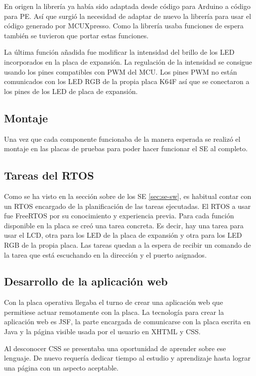En origen la librería ya había sido adaptada desde código para Arduino a
código para PE. Así que surgió la necesidad de adaptar de nuevo la librería para
usar el código generado por MCUXpresso. Como la librería usaba funciones de
espera también se tuvieron que portar estas funciones.

La última función añadida fue modificar la intensidad del brillo de los LED
incorporados en la placa de expansión. La regulación de la intensidad se
consigue usando los pines compatibles con PWM del MCU. Los pines PWM no
están comunicados con los LED RGB de la propia placa K64F así que se conectaron
a los pines de los LED de placa de expansión.

\subsection{Montaje }{\label{sec:desarrollo-montaje}}
Una vez que cada componente funcionaba de la manera esperada se realizó
el montaje en las placas de pruebas para poder hacer funcionar el SE al
completo. 

\subsection{Tareas del RTOS}{\label{sec:desarrollo-rtos}}
Como se ha visto en la sección sobre  de los SE 
\ref{sec:se-sw}, es habitual contar con un RTOS encargado de la planificación
de las tareas ejecutadas. El RTOS a usar fue FreeRTOS por su conocimiento y
experiencia previa. Para cada función disponible en la placa se creó una tarea
concreta. Es decir, hay una tarea para usar el LCD, otra para los LED de la
placa de expansión y otra  para los LED RGB de la propia placa. Las tareas
quedan a la espera de recibir un comando de la tarea que está escuchando en la
dirección y el puerto asignados.

\subsection{Desarrollo de la aplicación web}{\label{sec:desarrollo-app}}
Con la placa operativa llegaba el turno de crear una aplicación web que
permitiese actuar remotamente con la placa. La tecnología para crear la
aplicación web es JSF, la parte encargada de comunicarse con la placa escrita
en Java y la página visible usada por el usuario en XHTML y CSS.

Al desconocer CSS se presentaba una oportunidad de aprender sobre ese lenguaje.
De nuevo requería dedicar tiempo al estudio y aprendizaje hasta lograr una
página con un aspecto aceptable.

